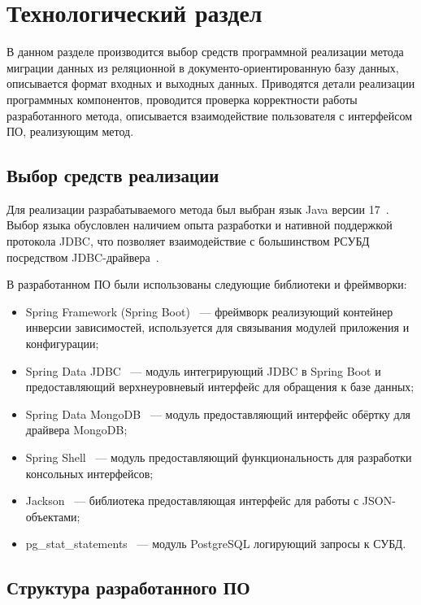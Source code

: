 \chapter{Технологический раздел}
В данном разделе производится выбор средств программной реализации
метода миграции данных из реляционной в документо-ориентированную базу данных,
описывается формат входных и выходных данных.
Приводятся детали реализации программных компонентов, 
проводится проверка корректности работы разработанного метода, 
описывается взаимодействие пользователя с интерфейсом ПО, реализующим метод.

\section{Выбор средств реализации} 
Для реализации разрабатываемого метода был выбран язык Java версии 17~\cite{openjdk-17}.
Выбор языка обусловлен наличием опыта разработки и нативной поддержкой протокола JDBC,
что позволяет взаимодействие с большинством РСУБД посредством JDBC-драйвера~\cite{jdbc-api}.

В разработанном ПО были использованы следующие библиотеки и фреймворки:
\begin{itemize}[label=---]
    \item Spring Framework (Spring Boot)~\cite{spring-boot} --- фреймворк реализующий контейнер инверсии зависимостей, 
    используется для связывания модулей приложения и конфигурации;
    \item Spring Data JDBC~\cite{spring-data-jdbc} --- модуль интегрирующий JDBC в Spring Boot и
    предоставляющий верхнеуровневый интерфейс для обращения к базе данных;
    \item Spring Data MongoDB~\cite{spring-data-mongodb} --- модуль предоставляющий интерфейс обёртку для драйвера MongoDB;
    \item Spring Shell~\cite{spring-shell} --- модуль предоставляющий функциональность для разработки консольных интерфейсов;
    \item Jackson~\cite{jackson-databind} --- библиотека предоставляющая интерфейс для работы с JSON-объектами;
    \item pg\_stat\_statements~\cite{pg-stat-statements} --- модуль PostgreSQL логирующий запросы к СУБД.
\end{itemize}
 
\clearpage 


\clearpage
\section{Структура разработанного ПО}

